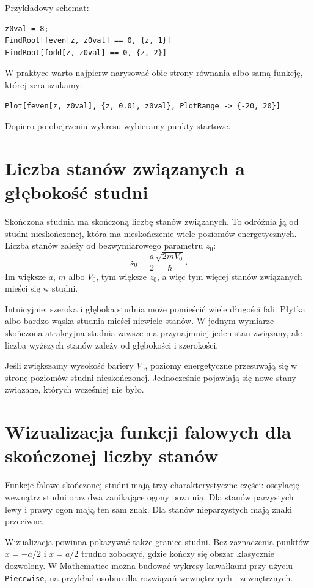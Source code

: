 Przykładowy schemat:
\begin{verbatim}
z0val = 8;
FindRoot[feven[z, z0val] == 0, {z, 1}]
FindRoot[fodd[z, z0val] == 0, {z, 2}]
\end{verbatim}
W praktyce warto najpierw narysować obie strony równania albo samą funkcję, której zera szukamy:
\begin{verbatim}
Plot[feven[z, z0val], {z, 0.01, z0val}, PlotRange -> {-20, 20}]
\end{verbatim}
Dopiero po obejrzeniu wykresu wybieramy punkty startowe.

\section{Liczba stanów związanych a głębokość studni}

Skończona studnia ma skończoną liczbę stanów związanych. To odróżnia ją od studni nieskończonej, która ma nieskończenie wiele poziomów energetycznych. Liczba stanów zależy od bezwymiarowego parametru \(z_0\):
\[
    z_0=\frac{a}{2}\frac{\sqrt{2mV_0}}{\hbar}.
\]
Im większe \(a\), \(m\) albo \(V_0\), tym większe \(z_0\), a więc tym więcej stanów związanych mieści się w studni.

Intuicyjnie: szeroka i głęboka studnia może pomieścić wiele długości fali. Płytka albo bardzo wąska studnia mieści niewiele stanów. W jednym wymiarze skończona atrakcyjna studnia zawsze ma przynajmniej jeden stan związany, ale liczba wyższych stanów zależy od głębokości i szerokości.

\begin{examplebox}
Jeśli zwiększamy wysokość bariery \(V_0\), poziomy energetyczne przesuwają się w stronę poziomów studni nieskończonej. Jednocześnie pojawiają się nowe stany związane, których wcześniej nie było.
\end{examplebox}

\section{Wizualizacja funkcji falowych dla skończonej liczby stanów}

Funkcje falowe skończonej studni mają trzy charakterystyczne części: oscylację wewnątrz studni oraz dwa zanikające ogony poza nią. Dla stanów parzystych lewy i prawy ogon mają ten sam znak. Dla stanów nieparzystych mają znaki przeciwne.

Wizualizacja powinna pokazywać także granice studni. Bez zaznaczenia punktów \(x=-a/2\) i \(x=a/2\) trudno zobaczyć, gdzie kończy się obszar klasycznie dozwolony. W Mathematice można budować wykresy kawałkami przy użyciu \texttt{Piecewise}, na przykład osobno dla rozwiązań wewnętrznych i zewnętrznych.

